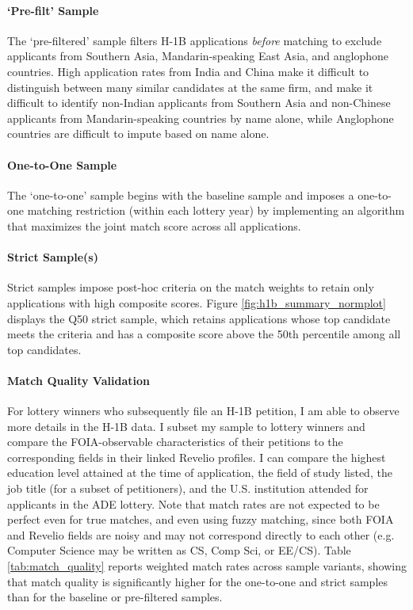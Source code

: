 \paragraph{`Pre-filt' Sample} The `pre-filtered' sample filters H-1B applications \textit{before} matching to exclude applicants from Southern Asia, Mandarin-speaking East Asia, and anglophone countries. High application rates from India and China make it difficult to distinguish between many similar candidates at the same firm, and make it difficult to identify non-Indian applicants from Southern Asia and non-Chinese applicants from Mandarin-speaking countries by name alone, while Anglophone countries are difficult to impute based on name alone. 

\paragraph{One-to-One Sample} The `one-to-one' sample begins with the baseline sample and imposes a one-to-one matching restriction (within each lottery year) by implementing an algorithm that maximizes the joint match score across all applications. 

\paragraph{Strict Sample(s)} Strict samples impose post-hoc criteria on the match weights to retain only applications with high composite scores. Figure \ref{fig:h1b_summary_normplot} displays the Q50 strict sample, which retains applications whose top candidate meets the criteria and has a composite score above the 50th percentile among all top candidates.

\paragraph{Match Quality Validation} For lottery winners who subsequently file an H-1B petition, I am able to observe more details in the H-1B data. I subset my sample to lottery winners and compare the FOIA-observable characteristics of their petitions to the corresponding fields in their linked Revelio profiles. I can compare the highest education level attained at the time of application, the field of study listed, the job title (for a subset of petitioners), and the U.S. institution attended for applicants in the ADE lottery. Note that match rates are not expected to be perfect even for true matches, and even using fuzzy matching, since both FOIA and Revelio fields are noisy and may not correspond directly to each other (e.g. Computer Science may be written as CS, Comp Sci, or EE/CS). Table \ref{tab:match_quality} reports weighted match rates across sample variants, showing that match quality is significantly higher for the one-to-one and strict samples than for the baseline or pre-filtered samples.


